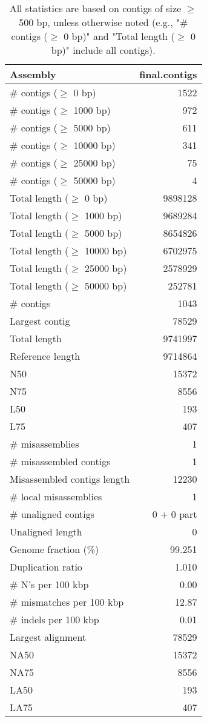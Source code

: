 \documentclass[12pt,a4paper]{article}
\begin{document}
\begin{table}[ht]
\begin{center}
\caption{All statistics are based on contigs of size $\geq$ 500 bp, unless otherwise noted (e.g., "\# contigs ($\geq$ 0 bp)" and "Total length ($\geq$ 0 bp)" include all contigs).}
\begin{tabular}{|l*{1}{|r}|}
\hline
Assembly & final.contigs \\ \hline
\# contigs ($\geq$ 0 bp) & 1522 \\ \hline
\# contigs ($\geq$ 1000 bp) & 972 \\ \hline
\# contigs ($\geq$ 5000 bp) & 611 \\ \hline
\# contigs ($\geq$ 10000 bp) & 341 \\ \hline
\# contigs ($\geq$ 25000 bp) & 75 \\ \hline
\# contigs ($\geq$ 50000 bp) & 4 \\ \hline
Total length ($\geq$ 0 bp) & 9898128 \\ \hline
Total length ($\geq$ 1000 bp) & 9689284 \\ \hline
Total length ($\geq$ 5000 bp) & 8654826 \\ \hline
Total length ($\geq$ 10000 bp) & 6702975 \\ \hline
Total length ($\geq$ 25000 bp) & 2578929 \\ \hline
Total length ($\geq$ 50000 bp) & 252781 \\ \hline
\# contigs & 1043 \\ \hline
Largest contig & 78529 \\ \hline
Total length & 9741997 \\ \hline
Reference length & 9714864 \\ \hline
N50 & 15372 \\ \hline
N75 & 8556 \\ \hline
L50 & 193 \\ \hline
L75 & 407 \\ \hline
\# misassemblies & 1 \\ \hline
\# misassembled contigs & 1 \\ \hline
Misassembled contigs length & 12230 \\ \hline
\# local misassemblies & 1 \\ \hline
\# unaligned contigs & 0 + 0 part \\ \hline
Unaligned length & 0 \\ \hline
Genome fraction (\%) & 99.251 \\ \hline
Duplication ratio & 1.010 \\ \hline
\# N's per 100 kbp & 0.00 \\ \hline
\# mismatches per 100 kbp & 12.87 \\ \hline
\# indels per 100 kbp & 0.01 \\ \hline
Largest alignment & 78529 \\ \hline
NA50 & 15372 \\ \hline
NA75 & 8556 \\ \hline
LA50 & 193 \\ \hline
LA75 & 407 \\ \hline
\end{tabular}
\end{center}
\end{table}
\end{document}
